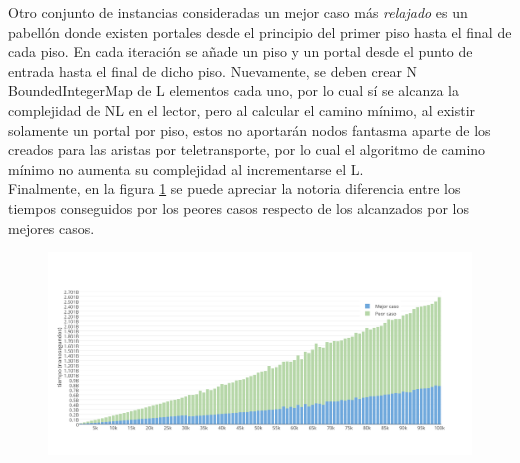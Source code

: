 Otro conjunto de instancias consideradas un mejor caso más \textit{relajado} es un pabellón donde existen portales desde el principio del primer piso hasta el final de cada piso. En cada iteración se añade un piso y un portal desde el punto de entrada hasta el final de dicho piso. Nuevamente, se deben crear N BoundedIntegerMap de L elementos cada uno, por lo cual sí se alcanza la complejidad de NL en el lector, pero al calcular el camino mínimo, al existir solamente un portal por piso, estos no aportarán nodos fantasma aparte de los creados para las aristas por teletransporte, por lo cual el algoritmo de camino mínimo no aumenta su complejidad al incrementarse el L.\\

 Finalmente, en la figura \ref{comparativa} se puede apreciar la notoria diferencia entre los tiempos conseguidos por los peores casos respecto de los alcanzados por los mejores casos.

\begin{figure}[H]
   \begin{center}
 	\includegraphics[width=18cm]{imagenes/ej2/comparativa.png}
	\label{comparativa}
   \end{center}
 \end{figure}


\newpage
